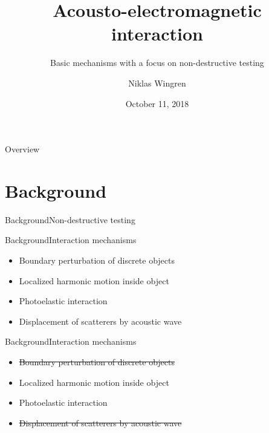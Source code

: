 \documentclass[11pt]{beamer}
\begin{document}
	\author{Niklas Wingren}
	\title{Acousto-electromagnetic interaction}
	\subtitle{Basic mechanisms with a focus on non-destructive testing}
	\date{October 11, 2018}
	\frame[plain]{\maketitle}
	
	\begin{frame}{Overview}
		\tableofcontents
	\end{frame}
	
	
	\section{Background}
	\begin{frame}{Background}{Non-destructive testing}
		
	\end{frame}
	
	\begin{frame}{Background}{Interaction mechanisms}
		\begin{itemize}
			\item Boundary perturbation of discrete objects
			\item Localized harmonic motion inside object
			\item Photoelastic interaction
			\item Displacement of scatterers by acoustic wave
		\end{itemize}
	\end{frame}
	
	\begin{frame}{Background}{Interaction mechanisms}
		\begin{itemize}
			\item \sout{Boundary perturbation of discrete objects}
			\item Localized harmonic motion inside object
			\item Photoelastic interaction
			\item \sout{Displacement of scatterers by acoustic wave}
		\end{itemize}
	\end{frame}
	
\end{document}
